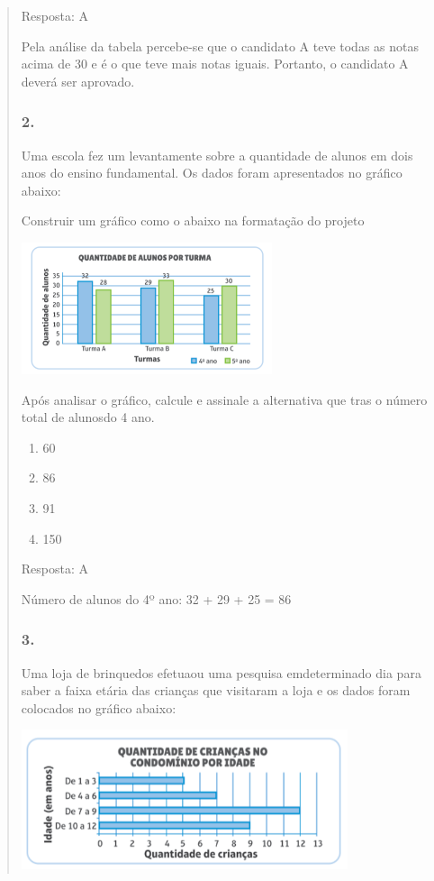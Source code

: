 \begin{enumerate}
\begin{escolha}
\begin{enumerate}
\begin{itemize}
\begin{itemize}
\begin{escolha}
\begin{quote}
\begin{escolha}
{Resposta: A

Pela análise da tabela percebe-se que o candidato A teve todas as notas
acima de 30 e é o que teve mais notas iguais. Portanto, o candidato A
deverá ser aprovado.

\subsubsection{2.}\label{section-102}

Uma escola fez um levantamente sobre a quantidade de alunos em dois anos
do ensino fundamental. Os dados foram apresentados no gráfico abaixo:

Construir um gráfico como o abaixo na formatação do projeto

\includegraphics[width=2.89744in,height=1.52156in]{media/image104.png}

Após analisar o gráfico, calcule e assinale a alternativa que tras o
número total de alunosdo 4 ano.

\begin{enumerate}
\def\labelenumi{\alph{enumi})}
\item
  60
\item
  86
\item
  91
\item
  150
\end{enumerate}

Resposta: A

Número de alunos do 4º ano: 32 + 29 + 25 = 86

\subsubsection{3.}\label{section-103}

Uma loja de brinquedos efetuaou uma pesquisa emdeterminado dia para
saber a faixa etária das crianças que visitaram a loja e os dados foram
colocados no gráfico abaixo:

\includegraphics[width=3.77564in,height=1.60972in]{media/image105.png}

}
\end{escolha}
\end{quote}
\end{escolha}
\end{itemize}
\end{itemize}
\end{enumerate}
\end{escolha}
\end{enumerate}
